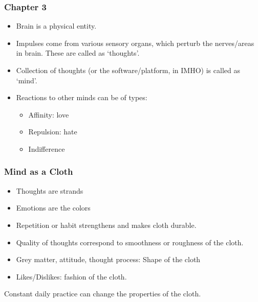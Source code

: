 \begin{frame}[fragile]
\frametitle{Chapter 3}
\begin{itemize}
\item Brain is a physical entity.
\item Impulses come from various sensory organs, which perturb the nerves/areas in brain. These are called as `thoughts'.
\item Collection of thoughts (or the software/platform, in IMHO) is called as `mind'.
\item Reactions to other minds can be of types:
\begin{itemize}
\item Affinity: love
\item Repulsion: hate
\item Indifference
\end{itemize}
\end{itemize}


\end{frame}

\begin{frame}[fragile]
\frametitle{Mind as a Cloth}
\begin{itemize}
\item Thoughts are strands
\item Emotions are the colors
\item Repetition or habit strengthens and makes cloth durable.
\item Quality of thoughts correspond to smoothness or roughness of the cloth.
\item Grey matter, attitude, thought process: Shape of the cloth
\item Likes/Dislikes: fashion of the cloth.
\end{itemize}

Constant daily practice can change the properties of the cloth.
\end{frame}

